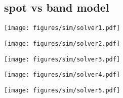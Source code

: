\documentclass[twocolumn]{aastex631}
\begin{document}
\subsection{spot vs band model}

\begin{figure*}
    \centering
    \begin{minipage}[b]{0.18\textwidth}
        \centering
        \texttt{[image: figures/sim/solver1.pdf]}
        \label{fig:sim-solver1}
     \end{minipage}
     \hfill
     \begin{minipage}[b]{0.18\textwidth}
         \centering
         \texttt{[image: figures/sim/solver2.pdf]}
         \label{fig:sim-solver2}
     \end{minipage}
     \hfill
     \begin{minipage}[b]{0.18\textwidth}
         \centering
         \texttt{[image: figures/sim/solver3.pdf]}
         \label{fig:sim-solver3}
     \end{minipage}
     \hfill
     \begin{minipage}[b]{0.18\textwidth}
         \centering
         \texttt{[image: figures/sim/solver4.pdf]}
         \label{fig:sim-solver4}
     \end{minipage}
     \hfill
     \begin{minipage}[b]{0.18\textwidth}
         \centering
         \texttt{[image: figures/sim/solver5.pdf]}
         \label{fig:sim-solver5}
     \end{minipage}
\end{figure*} 




\end{document}
